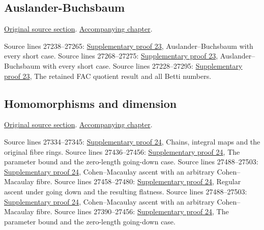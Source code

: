 \subsection{Auslander-Buchsbaum}
\hypertarget{algebra-source-section-Auslander-Buchsbaum}{}
\noindent\href{https://github.com/stacks/stacks-project/blob/a04446e57ec1fbc252a871afcec7752fb2807b14/algebra.tex\#L27222}{Original source section}. \href{algebra.pdf\#nameddest=section-Auslander-Buchsbaum}{Accompanying chapter}.

\begin{AlgebraSourceRoutes}
 Source lines 27238--27265: \hyperlink{algebra_regular_ab_notes_20260928}{Supplementary proof 23}, Auslander–Buchsbaum with every short case.
 Source lines 27268--27275: \hyperlink{algebra_regular_ab_notes_20260928}{Supplementary proof 23}, Auslander–Buchsbaum with every short case.
 Source lines 27228--27295: \hyperlink{algebra_regular_ab_notes_20260928}{Supplementary proof 23}, The retained FAC quotient result and all Betti numbers.
\end{AlgebraSourceRoutes}

\subsection{Homomorphisms and dimension}
\hypertarget{algebra-source-section-homomorphism-dimension}{}
\noindent\href{https://github.com/stacks/stacks-project/blob/a04446e57ec1fbc252a871afcec7752fb2807b14/algebra.tex\#L27305}{Original source section}. \href{algebra.pdf\#nameddest=section-homomorphism-dimension}{Accompanying chapter}.

\begin{AlgebraSourceRoutes}
 Source lines 27334--27345: \hyperlink{algebra_dimension_maps_notes_20260928}{Supplementary proof 24}, Chains, integral maps and the original fibre rings.
 Source lines 27436--27456: \hyperlink{algebra_dimension_maps_notes_20260928}{Supplementary proof 24}, The parameter bound and the zero-length going-down case.
 Source lines 27488--27503: \hyperlink{algebra_dimension_maps_notes_20260928}{Supplementary proof 24}, Cohen–Macaulay ascent with an arbitrary Cohen–Macaulay fibre.
 Source lines 27458--27480: \hyperlink{algebra_dimension_maps_notes_20260928}{Supplementary proof 24}, Regular ascent under going down and the resulting flatness.
 Source lines 27488--27503: \hyperlink{algebra_dimension_maps_notes_20260928}{Supplementary proof 24}, Cohen–Macaulay ascent with an arbitrary Cohen–Macaulay fibre.
 Source lines 27390--27456: \hyperlink{algebra_dimension_maps_notes_20260928}{Supplementary proof 24}, The parameter bound and the zero-length going-down case.
\end{AlgebraSourceRoutes}

